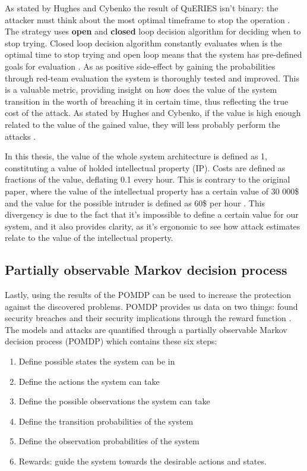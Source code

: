 As stated by Hughes and Cybenko the result of QuERIES isn't binary:
the attacker must think about the most optimal timeframe to stop the
operation \cite{hughes2013quantitative}. The strategy uses
\textbf{open} and \textbf{closed} loop decision algorithm for deciding
when to stop trying. Closed loop decision algorithm constantly
evaluates when is the optimal time to stop trying and open loop means
that the system has pre-defined goals for evaluation
\cite{carin2008cybersecurity}. As as positive side-effect by gaining
the probabilities through red-team evaluation the system is
thoroughly tested and improved. This is a valuable metric, providing
insight on how does the value of the system transition in the worth of
breaching it in certain time, thus reflecting the true cost of the
attack. As stated by Hughes and Cybenko, if the value is high enough
related to the value of the gained value, they will less probably
perform the attacks \cite{hughes2013quantitative}.

In this thesis, the value of the whole system architecture is
defined as 1, constituting a value of holded intellectual
property (IP). Costs are defined as fractions of the value, deflating 
0.1 every hour. This is contrary to the original paper, where the
value of the intellectual property has a certain value of 30 000\$ and
the value for the possible intruder is defined as 60\$ per hour
\cite{carin2008cybersecurity}. This divergency is due to the fact
that it's impossible to define a certain value for our system,
and it also provides clarity, as it's ergonomic to see how attack
estimates relate to the value of the intellectual property. 

\subsection{Partially observable Markov decision process}

Lastly, using the results of the POMDP can be used to increase the
protection against the discovered problems. POMDP provides us data on
two things: found security breaches and their security implications
through the reward function \cite{carin2008cybersecurity}.  The models
and attacks are quantified through a partially observable Markov
decision process (POMDP) which contains these six steps:

\begin{enumerate}
    \item Define possible states the system can be in
    \item Define the actions the system can take
    \item Define the possible observations the system can take
    \item Define the transition probabilities of the system
    \item Define the observation probabilities of the system
    \item Rewards: guide the system towards the desirable actions and
      states.
\end{enumerate} \cite{hughes2013quantitative}


